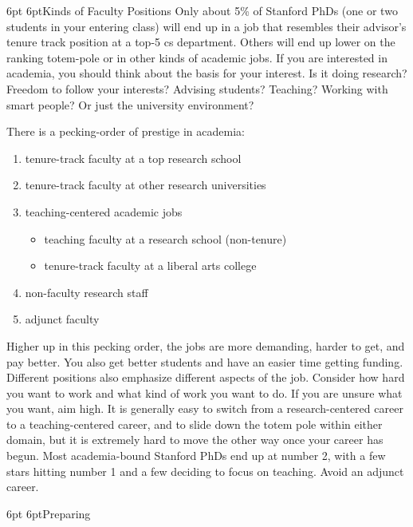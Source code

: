 \documentclass[10pt]{book}
\makeatletter
\def\phd{{\sc PhD}}
\renewcommand{\subsection}{\@startsection{subsection}{2}{0mm}%
   {6pt}%
   {6pt}{\normalfont\normalsize\itshape}}
\makeatother
\begin{document}
\subsection{Kinds of Faculty Positions}
Only about 5\% of Stanford \phd s (one or two students in your entering class) will end up
in a job that resembles their
advisor's tenure track position at a top-5 {\sc cs} department. Others will end
up lower on the ranking totem-pole or in other kinds of academic jobs. If you
are interested in academia, you should think about the basis for your interest.
Is it doing research?  Freedom to follow your interests?  Advising students?
Teaching?  Working with smart people? Or just the university environment?

There is a pecking-order of prestige in academia:

\begin{enumerate}
\setlength{\itemsep}{1pt}
\setlength{\parskip}{0pt}
\setlength{\parsep}{0pt}
\item tenure-track faculty at a top research school
\item tenure-track faculty at other research universities
\item teaching-centered academic jobs
\begin{itemize}
\item teaching faculty at a research school (non-tenure)
\item tenure-track faculty at a liberal arts college
\end{itemize}
\item non-faculty research staff
\item adjunct faculty
\end{enumerate}

Higher up in this pecking order, the jobs are more demanding, harder to get,
and pay better.  You also get better students and have an easier time getting
funding.  Different positions also emphasize different aspects
of the job.  Consider how hard you want to work and what kind of work you want
to do. If you are unsure what you want, aim high.  It is generally easy
to switch from a research-centered career to a teaching-centered career, and to
slide down the totem pole within either domain, but it is extremely hard to
move the other way once your career has begun.  Most academia-bound Stanford
\phd s end up at number 2, with a few stars hitting number 1 and a few deciding
to focus on teaching.  Avoid an adjunct career.

\subsection{Preparing}
\end{document}
